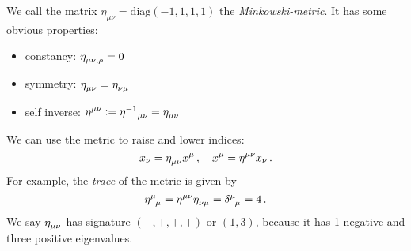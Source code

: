 We call the matrix $\eta_{\mu\nu}=\mathrm{diag}(-1,1,1,1)$ the
\emph{Minkowski-metric}. It has some obvious properties:
\begin{itemize}
    \item constancy: $\tensor{\eta}{_\mu_\nu_,_\rho}=0$
    \item symmetry: $\tensor{\eta}{_\mu_\nu}=\tensor{\eta}{_\nu_\mu}$
    \item self inverse:
    $\tensor{\eta}{^\mu^\nu}:=\tensor{{\eta^{-1}}}{_\mu_\nu}=\tensor{\eta}{_\mu_\nu}$
\end{itemize}
We can use the metric to raise and lower indices:
\begin{equation}
    x_\nu=\tensor{\eta}{_\mu_\nu}x^\mu\, ,\quad x^\mu=\tensor{\eta}{^\mu^\nu}x_\nu\, .
\end{equation}
For example, the \emph{trace} of the metric is given by
\begin{equation}
    \tensor{\eta}{^\mu_\mu}=\tensor{\eta}{^\mu^\nu}\tensor{\eta}{_\nu_\mu}
    =\tensor{\delta}{^\mu_\mu}=4\, .
\end{equation}
We say $\tensor{\eta}{_\mu_\nu}$ has signature $(-,+,+,+)$ or $(1,3)$, because
it has 1 negative and three positive eigenvalues.
